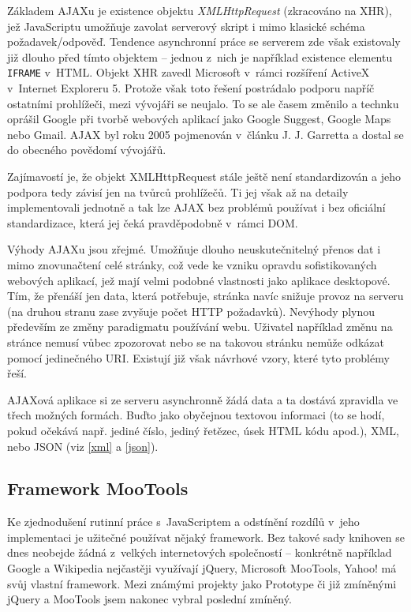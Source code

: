 Základem AJAXu je existence objektu {\it XMLHttpRequest} (zkracováno
na XHR), jež JavaScriptu umožňuje zavolat serverový skript i mimo
klasické schéma požadavek/odpověď. Tendence asynchronní práce se
serverem zde však existovaly již dlouho před tímto objektem --
jednou z~nich je například existence elementu {\tt IFRAME} v~HTML.
Objekt XHR zavedl Microsoft v~rámci rozšíření ActiveX v~Internet
Exploreru 5. Protože však toto řešení postrádalo podporu napříč
ostatními prohlížeči, mezi vývojáři se neujalo. To se ale časem
změnilo a technku oprášil Google při tvorbě webových aplikací jako
Google Suggest, Google Maps nebo Gmail. AJAX byl roku 2005 pojmenován
v~článku J. J. Garretta \cite{ajaxArticle} a dostal se do obecného
povědomí vývojářů.

Zajímavostí je, že objekt XMLHttpRequest stále ještě není
standardizován a jeho podpora tedy závisí jen na 
tvůrců prohlížečů. Ti jej však až na detaily implementovali jednotně
a tak lze AJAX bez problémů používat i bez oficiální standardizace,
která jej čeká pravděpodobně v~rámci DOM.

Výhody AJAXu jsou zřejmé. Umožňuje dlouho neuskutečnitelný přenos dat
i mimo znovunačtení celé stránky, což vede ke vzniku opravdu
sofistikovaných webových aplikací, jež mají velmi podobné vlastnosti
jako aplikace desktopové. Tím, že přenáší jen data, která potřebuje,
stránka navíc snižuje provoz na serveru (na druhou stranu zase
zvyšuje počet HTTP požadavků). Nevýhody plynou především ze změny
paradigmatu používání webu. Uživatel například změnu na stránce
nemusí vůbec zpozorovat nebo se na takovou stránku nemůže odkázat
pomocí jedinečného URI. Existují již však návrhové vzory, které tyto
problémy řeší.

AJAXová aplikace si ze serveru asynchronně žádá data a ta dostává
zpravidla ve třech možných formách. Buďto jako obyčejnou textovou
informaci (to se hodí, pokud očekává např. jediné číslo, jediný
řetězec, úsek HTML kódu apod.), XML, nebo JSON (viz \ref{xml} a
\ref{json}).

\subsection{Framework MooTools}
Ke zjednodušení rutinní práce s~JavaScriptem a odstínění rozdílů
v~jeho implementaci je užitečné používat nějaký framework. Bez takové sady
knihoven se dnes neobejde žádná z~velkých internetových společností --
konkrétně například Google a Wikipedia nej\-častěji využívají jQuery,
Microsoft MooTools, Yahoo! má svůj vlastní framework. Mezi známými projekty jako
Prototype či již zmíněnými jQuery a MooTools jsem nakonec vybral
poslední zmíněný.

